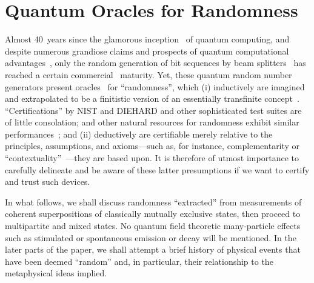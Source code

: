 \documentclass[entropy,article,accept,oneauthor,pdftex]{Definitions/mdpi}
\begin{document}







\section{Quantum Oracles for Randomness}

Almost 40~years since the glamorous inception~\cite{feynman,deutsch,deutsch:92,nielsen-book10,mermin-07}
of quantum computing, and
despite numerous grandiose claims and prospects of quantum computational advantages~\cite{svozil-2016-quantum-hokus-pokus,Calude-C&E-2020,Um-2013},
only the random generation of bit sequences by beam
splitters~\cite{svozil-qct,zeilinger:qct,stefanov-2000,svozil-2009-howto,Furst:10,PhysRevA.82.022102,Abbott:2010uq,10.1038/nature09008,Abbott_2019}
has reached a certain commercial~\cite{Quantis} maturity.
Yet, these quantum random number generators present oracles~\cite{benn-84,svozil-qct} for ``randomness'',
which
(i) inductively are imagined and extrapolated to be a finitistic version of an
essentially transfinite concept~\cite{martin-lof}. ``Certifications'' by NIST and DIEHARD and other sophisticated
test suites are of little consolation; and other natural resources for randomness
exhibit similar performances~\cite{PhysRevA.82.022102,Abbott_2019};
and
(ii) deductively are certifiable merely relative to the principles, assumptions, and axioms---such as, for instance, complementarity or
``contextuality''~\cite{svozil-2009-howto,10.1038/nature09008,PhysRevA.89.032109,2015-AnalyticKS}---they are based upon.
It is therefore of utmost importance to carefully delineate and be aware of these latter presumptions if we want to certify and trust such devices.

In what follows, we shall discuss randomness ``extracted'' from measurements of coherent superpositions of classically mutually exclusive
states, then proceed to multipartite and mixed states.
No quantum field theoretic many-particle effects such as stimulated or spontaneous emission or decay will be mentioned.
In the later parts of the paper, we shall attempt a brief history of physical events that have been deemed ``random'' and,
in particular, their relationship to the metaphysical ideas implied.
\end{document}
